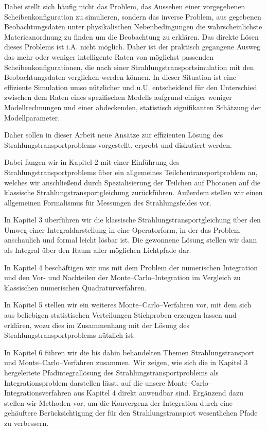 	Dabei stellt sich häufig nicht das Problem, das Aussehen einer vorgegebenen Scheibenkonfiguration zu simulieren, sondern das inverse Problem, aus gegebenen Beobachtungsdaten unter physikalischen Nebenbedingungen die wahrscheinlichste Materieanordnung zu finden um die Beobachtung zu erklären. Das direkte Lösen dieses Problems ist i.A. nicht möglich. Daher ist der praktisch gegangene Ausweg das mehr oder weniger intelligente Raten von möglichst passenden Scheibenkonfigurationen, die nach einer Strahlungstransportsimulation mit den Beobachtungsdaten verglichen werden können. In dieser Situation ist eine effiziente Simulation umso nützlicher und u.U. entscheidend für den Unterschied zwischen dem Raten eines spezifischen Modells aufgrund einiger weniger Modellrechnungen und einer abdeckenden, statistisch signifikanten Schätzung der Modellparameter.
	
	Daher sollen in dieser Arbeit neue Ansätze zur effizienten Lösung des Strahlungstransportproblems vorgestellt, erprobt und diskutiert werden.
	
	Dabei fangen wir in Kapitel 2 mit einer Einführung des Strahlungstransportproblems über ein allgemeines Teilchentransportproblem an, welches wir anschließend durch Spezialisierung der Teilchen auf Photonen auf die klassische Strahlungstransportgleichung zurückführen. Außerdem stellen wir einen allgemeinen Formalismus für Messungen des Strahlungsfeldes vor.
	
	In Kapitel 3 überführen wir die klassische Strahlungstransportgleichung über den Umweg einer Integraldarstellung in eine Operatorform, in der das Problem anschaulich und formal leicht lösbar ist. Die gewonnene Lösung stellen wir dann als Integral über den Raum aller möglichen Lichtpfade dar.
	
	In Kapitel 4 beschäftigen wir uns mit dem Problem der numerischen Integration und den Vor- und Nachteilen der Monte--Carlo--Integration im Vergleich zu klassischen numerischen Quadraturverfahren.
	
	In Kapitel 5 stellen wir ein weiteres Monte--Carlo--Verfahren vor, mit dem sich aus beliebigen statistischen Verteilungen Stichproben erzeugen lassen und erklären, wozu dies im Zusammenhang mit der Lösung des Strahlungstransportproblems nützlich ist.
	
	In Kapitel 6 führen wir die bis dahin behandelten Themen Strahlungstransport und Monte--Carlo--Verfahren zusammen. Wir zeigen, wie sich die in Kapitel 3 hergeleitete Pfadintegrallösung des Strahlungstransportproblems als Integrationsproblem darstellen lässt, auf die unsere Monte--Carlo--Integrationsverfahren aus Kapitel 4 direkt anwendbar sind. Ergänzend dazu stellen wir Methoden vor, um die Konvergenz der Integration durch eine gehäuftere Berücksichtigung der für den Strahlungstransport wesentlichen Pfade zu verbessern.
	
